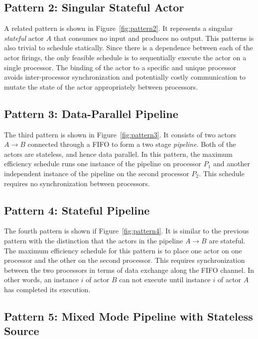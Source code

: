 \subsection{Pattern 2: Singular Stateful Actor}

A related pattern is shown in Figure~\ref{fig:pattern2}. It
represents a singular {\it stateful} actor $A$ that consumes no input
and produces no output.
This patterns is also trivial to schedule statically. Since there is a
dependence between each of the actor firings, the only feasible
schedule is to sequentially execute the actor on a single
processor. The binding of the actor to a specific and unique
processor avoids inter-processor synchronization and
potentially costly communication to mutate the state of the actor
appropriately between processors.

\subsection{Pattern 3: Data-Parallel Pipeline}

The third pattern is shown in Figure~\ref{fig:pattern3}. It consists
of two actors $A\rightarrow B$ connected through a FIFO to form a two
stage {\it pipeline}. Both of the actors are stateless, and hence data
parallel. In this pattern, the maximum efficiency schedule runs one
instance of the pipeline on processor $P_1$ and another independent
instance of the pipeline on the second processor $P_2$.  This schedule
requires no synchronization between processors.

\subsection{Pattern 4: Stateful Pipeline}

The fourth pattern is shown if Figure~\ref{fig:pattern4}. It is
similar to the previous pattern with the distinction that the actors
in the pipeline $A\rightarrow B$ are stateful. The maximum efficiency
schedule for this pattern is to place one actor on one processor and
the other on the second processor. This requires synchronization
between the two processors in terms of data exchange along the FIFO
channel. In other words, an instance $i$ of actor $B$ can not execute
until instance $i$ of actor $A$ has completed its execution.  

\subsection{Pattern 5: Mixed Mode Pipeline with Stateless Source}

